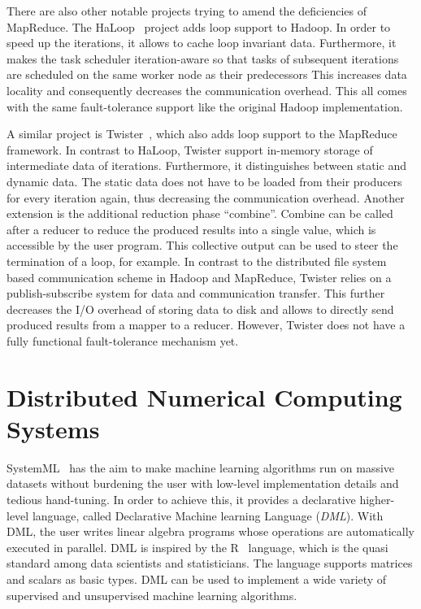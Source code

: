 There are also other notable projects trying to amend the deficiencies of MapReduce.
The HaLoop~\cite{bu:pve2010a} project adds loop support to Hadoop.
In order to speed up the iterations, it allows to cache loop invariant data.
Furthermore, it makes the task scheduler iteration-aware so that tasks of subsequent iterations are scheduled on the same worker node as their predecessors
This increases data locality and consequently decreases the communication overhead.
This all comes with the same fault-tolerance support like the original Hadoop implementation.

A similar project is Twister~\cite{ekanayake:2010a}, which also adds loop support to the MapReduce framework.
In contrast to HaLoop, Twister support in-memory storage of intermediate data of iterations.
Furthermore, it distinguishes between static and dynamic data.
The static data does not have to be loaded from their producers for every iteration again, thus decreasing the communication overhead.
Another extension is the additional reduction phase ``combine''.
Combine can be called after a reducer to reduce the produced results into a single value, which is accessible by the user program.
This collective output can be used to steer the termination of a loop, for example.
In contrast to the distributed file system based communication scheme in Hadoop and MapReduce, Twister relies on a publish-subscribe system for data and communication transfer.
This further decreases the I/O overhead of storing data to disk and allows to directly send produced results from a mapper to a reducer.
However, Twister does not have a fully functional fault-tolerance mechanism yet.

\section{Distributed Numerical Computing Systems}

SystemML~\cite{ghoting:2011a} has the aim to make machine learning algorithms run on massive datasets without burdening the user with low-level implementation details and tedious hand-tuning.
In order to achieve this, it provides a declarative higher-level language, called Declarative Machine learning Language (\emph{DML}).
With DML, the user writes linear algebra programs whose operations are automatically executed in parallel.
DML is inspired by the R~\cite{r:1993a} language, which is the quasi standard among data scientists and statisticians.
The language supports matrices and scalars as basic types.
DML can be used to implement a wide variety of supervised and unsupervised machine learning algorithms.

